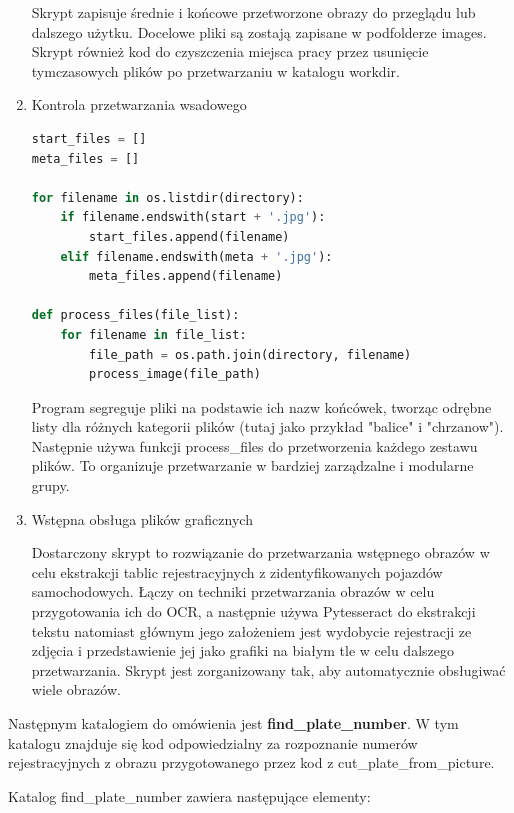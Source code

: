 \documentclass[12pt,a4paper,oneside]{article}
\theoremstyle{definition}
\numberwithin{equation}{section}
\begin{document}
\begin{enumerate}
Skrypt zapisuje średnie i końcowe przetworzone obrazy do przeglądu lub dalszego użytku. Docelowe pliki są zostają zapisane w podfolderze images. Skrypt również kod do czyszczenia miejsca pracy przez usunięcie tymczasowych plików po przetwarzaniu w katalogu workdir.

\item Kontrola przetwarzania wsadowego


\begin{lstlisting}[language=Python]
start_files = []
meta_files = []

for filename in os.listdir(directory):
    if filename.endswith(start + '.jpg'):
        start_files.append(filename)
    elif filename.endswith(meta + '.jpg'):
        meta_files.append(filename)

def process_files(file_list):
    for filename in file_list:
        file_path = os.path.join(directory, filename)
        process_image(file_path)

\end{lstlisting} 

Program segreguje pliki na podstawie ich nazw końcówek, tworząc odrębne listy dla różnych kategorii plików (tutaj jako przykład "balice" i "chrzanow"). Następnie używa funkcji process{\_}files do przetworzenia każdego zestawu plików. To organizuje przetwarzanie w bardziej zarządzalne i modularne grupy.

\item Wstępna obsługa plików graficznych

Dostarczony skrypt to rozwiązanie do przetwarzania wstępnego obrazów w celu ekstrakcji tablic rejestracyjnych z zidentyfikowanych pojazdów samochodowych. Łączy on techniki przetwarzania obrazów w celu przygotowania ich do OCR, a następnie używa Pytesseract do ekstrakcji tekstu natomiast głównym jego założeniem jest wydobycie rejestracji ze zdjęcia i przedstawienie jej jako grafiki na białym tle w celu dalszego przetwarzania. Skrypt jest zorganizowany tak, aby automatycznie obsługiwać wiele obrazów.
\end{enumerate}


\newpage






Następnym katalogiem do omówienia jest \textbf{find{\_}plate{\_}number}. W tym katalogu znajduje się kod odpowiedzialny za rozpoznanie numerów rejestracyjnych z obrazu przygotowanego przez kod z {cut{\_}plate{\_}from{\_}picture}. 

Katalog find{\_}plate{\_}number zawiera następujące elementy:
\end{document}
